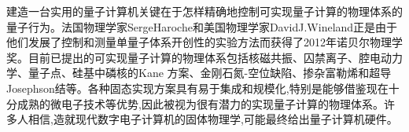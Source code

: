 建造一台实用的量子计算机关键在于怎样精确地控制可实现量子计算的物理体系的量子行为。法国物理学家SergeHaroche和美国物理学家DavidJ.Wineland正是由于他们发展了控制和测量单量子体系开创性的实验方法而获得了2012年诺贝尔物理学奖。目前已提出的可实现量子计算的物理体系包括核磁共振、囚禁离子、腔电动力学、量子点、硅基中磷核的Kane 方案、金刚石氮-空位缺陷、掺杂富勒烯和超导 Josephson结等。各种固态实现方案具有易于集成和规模化,特别是能够借鉴现在十分成熟的微电子技术等优势,因此被视为很有潜力的实现量子计算的物理体系。许多人相信,造就现代数字电子计算机的固体物理学,可能最终给出量子计算机硬件。

